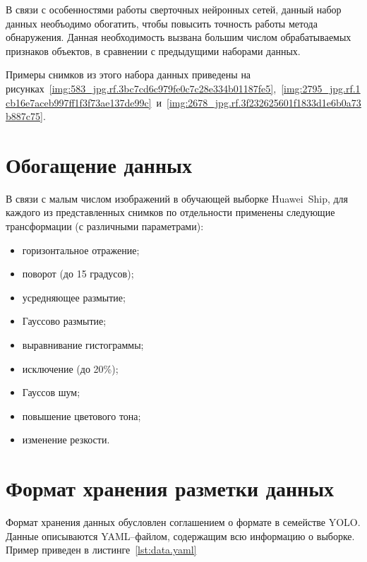 В связи с особенностями работы сверточных нейронных сетей, данный набор данных необъодимо обогатить, чтобы повысить точность работы метода обнаружения. Данная необходимость вызвана большим числом обрабатываемых признаков объектов, в сравнении с предыдущими наборами данных.

Примеры снимков из этого набора данных приведены на рисунках~\ref{img:583_jpg.rf.3bc7cd6c979fe0c7c28e334b01187fe5},~\ref{img:2795_jpg.rf.1cb16e7aceb997ff1f3f73ae137de99c}~и~\ref{img:2678_jpg.rf.3f232625601f1833d1e6b0a73b887c75}.




\section{Обогащение данных}

В связи с малым числом изображений в обучающей выборке Huawei~Ship, для каждого из представленных снимков по отдельности применены следующие трансформации (с различными параметрами):
\begin{itemize}[label=---]
    \item горизонтальное отражение;
    \item поворот (до 15 градусов);
    \item усредняющее размытие;
    \item Гауссово размытие;
    \item выравнивание гистограммы;
    \item исключение (до 20\%);
    \item Гауссов шум;
    \item повышение цветового тона;
    \item изменение резкости.
\end{itemize}

\section{Формат хранения разметки данных}

Формат хранения данных обусловлен соглашением о формате в семействе YOLO. Данные описываются YAML--файлом, содержащим всю информацию о выборке. Пример приведен в листинге~\ref{lst:data.yaml} 

